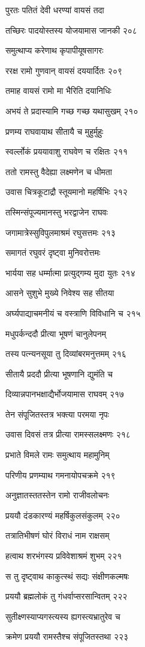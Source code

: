 पुरतः पतितं देवी धरण्यां वायसं तदा

तच्छिरः पादयोस्तस्य योजयामास जानकी २०८

समुत्थाप्य करेणाथ कृपापीयूषसागरः

ररक्ष रामो गुणवान् वायसं दययार्दितः २०९

तमाह वायसं रामो मा भैरिति दयानिधिः

अभयं ते प्रदास्यामि गच्छ गच्छ यथासुखम् २१०

प्रणम्य राघवायाथ सीतायै च मुहुर्मुहुः

स्वर्ल्लोकं प्रययावाशु राघवेण च रक्षितः २११

ततो रामस्तु वैदेह्या लक्ष्मणेन च धीमता

उवास चित्रकूटाद्रौ स्तूयमानो महर्षिभिः २१२

तस्मिन्संपूज्यमानस्तु भरद्वाजेन राघवः

जगामात्रेस्सुविपुलमाश्रमं रघुसत्तमः २१३

समागतं रघुवरं दृष्ट्वा मुनिवरोत्तमः

भार्यया सह धर्म्मात्मा प्रत्युद्गम्य मुदा युतः २१४

आसने सुशुभे मुख्ये निवेश्य सह सीतया

अर्घ्यपाद्याचमनीयं च वस्त्राणि विविधानि च २१५

मधुपर्कन्ददौ प्रीत्या भूषणं चानुलेपनम्

तस्य पत्न्यनसूया तु दिव्यांबरमनुत्तमम् २१६

सीतायै प्रददौ प्रीत्या भूषणानि द्युमंति च

दिव्यान्नपानभक्षाद्यैर्भोजयामास राघवम् २१७

तेन संपूजितस्तत्र भक्त्या परमया नृपः

उवास दिवसं तत्र प्रीत्या रामस्सलक्ष्मणः २१८

प्रभाते विमले रामः समुत्थाय महामुनिम्

परिणीय प्रणम्याथ गमनायोपचक्रमे २१९

अनुज्ञातस्ततस्तेन रामो राजीवलोचनः

प्रययौ दंडकारण्यं महर्षिकुलसंकुलम् २२०

तत्रातिभीषणं घोरं विराधं नाम राक्षसम्

हत्वाथ शरभंगस्य प्रविवेशाश्रमं शुभम् २२१

स तु दृष्ट्वाथ काकुत्स्थं सद्यः संक्षीणकल्मषः

प्रययौ ब्रह्मलोकं तु गंधर्वाप्सरसान्वितम् २२२

सुतीक्ष्णस्याप्यगस्त्यस्य ह्यगस्त्यभ्रातुरेव च

क्रमेण प्रययौ रामस्तैश्च संपूजितस्तथा २२३

